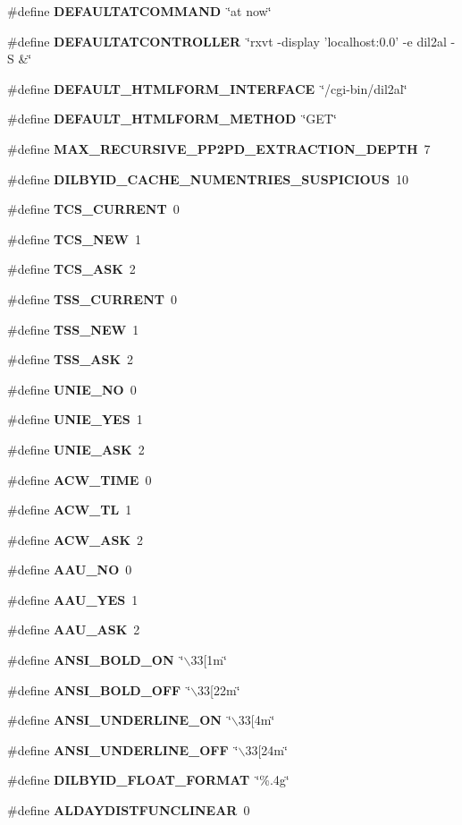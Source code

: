 \begin{CompactItemize}
\item 
\#define {\bf DEFAULTATCOMMAND}\ \char`\"{}at now\char`\"{}
\item 
\#define {\bf DEFAULTATCONTROLLER}\ \char`\"{}rxvt -display 'localhost:0.0' -e dil2al -S \&\char`\"{}
\item 
\#define {\bf DEFAULT\_\-HTMLFORM\_\-INTERFACE}\ \char`\"{}/cgi-bin/dil2al\char`\"{}
\item 
\#define {\bf DEFAULT\_\-HTMLFORM\_\-METHOD}\ \char`\"{}GET\char`\"{}
\item 
\#define {\bf MAX\_\-RECURSIVE\_\-PP2PD\_\-EXTRACTION\_\-DEPTH}\ 7
\item 
\#define {\bf DILBYID\_\-CACHE\_\-NUMENTRIES\_\-SUSPICIOUS}\ 10
\item 
\#define {\bf TCS\_\-CURRENT}\ 0
\item 
\#define {\bf TCS\_\-NEW}\ 1
\item 
\#define {\bf TCS\_\-ASK}\ 2
\item 
\#define {\bf TSS\_\-CURRENT}\ 0
\item 
\#define {\bf TSS\_\-NEW}\ 1
\item 
\#define {\bf TSS\_\-ASK}\ 2
\item 
\#define {\bf UNIE\_\-NO}\ 0
\item 
\#define {\bf UNIE\_\-YES}\ 1
\item 
\#define {\bf UNIE\_\-ASK}\ 2
\item 
\#define {\bf ACW\_\-TIME}\ 0
\item 
\#define {\bf ACW\_\-TL}\ 1
\item 
\#define {\bf ACW\_\-ASK}\ 2
\item 
\#define {\bf AAU\_\-NO}\ 0
\item 
\#define {\bf AAU\_\-YES}\ 1
\item 
\#define {\bf AAU\_\-ASK}\ 2
\item 
\#define {\bf ANSI\_\-BOLD\_\-ON}\ \char`\"{}$\backslash$33[1m\char`\"{}
\item 
\#define {\bf ANSI\_\-BOLD\_\-OFF}\ \char`\"{}$\backslash$33[22m\char`\"{}
\item 
\#define {\bf ANSI\_\-UNDERLINE\_\-ON}\ \char`\"{}$\backslash$33[4m\char`\"{}
\item 
\#define {\bf ANSI\_\-UNDERLINE\_\-OFF}\ \char`\"{}$\backslash$33[24m\char`\"{}
\item 
\#define {\bf DILBYID\_\-FLOAT\_\-FORMAT}\ \char`\"{}\%.4g\char`\"{}
\item 
\#define {\bf ALDAYDISTFUNCLINEAR}\ 0
\item 

\end{CompactItemize}
